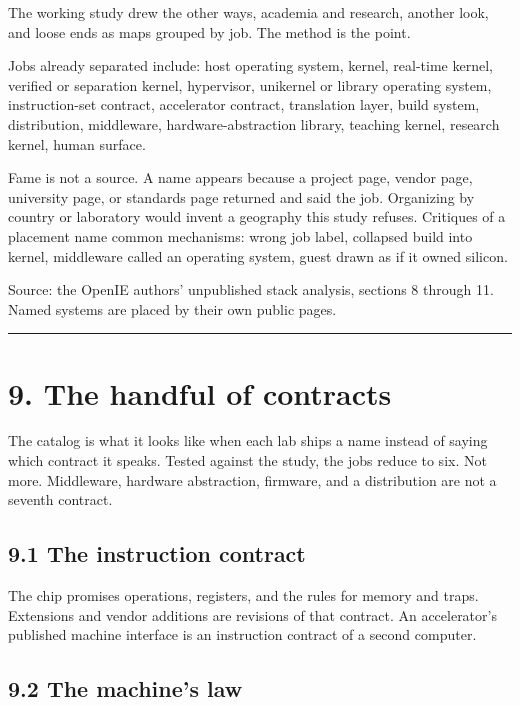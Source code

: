 \documentclass[10pt,letterpaper]{article}
\begin{document}
The working study drew the other ways, academia and research, another
look, and loose ends as maps grouped by job. The method is the point.

Jobs already separated include: host operating system, kernel, real-time
kernel, verified or separation kernel, hypervisor, unikernel or library
operating system, instruction-set contract, accelerator contract,
translation layer, build system, distribution, middleware,
hardware-abstraction library, teaching kernel, research kernel, human
surface.

Fame is not a source. A name appears because a project page, vendor
page, university page, or standards page returned and said the job.
Organizing by country or laboratory would invent a geography this study
refuses. Critiques of a placement name common mechanisms: wrong job
label, collapsed build into kernel, middleware called an operating
system, guest drawn as if it owned silicon.

Source: the OpenIE authors' unpublished stack analysis, sections 8
through 11. Named systems are placed by their own public pages.

\begin{center}\rule{0.5\linewidth}{0.5pt}\end{center}

\section{9. The handful of contracts}\label{the-handful-of-contracts}

The catalog is what it looks like when each lab ships a name instead of
saying which contract it speaks. Tested against the study, the jobs
reduce to six. Not more. Middleware, hardware abstraction, firmware, and
a distribution are not a seventh contract.

\subsection{9.1 The instruction
contract}\label{the-instruction-contract}

The chip promises operations, registers, and the rules for memory and
traps. Extensions and vendor additions are revisions of that contract.
An accelerator's published machine interface is an instruction contract
of a second computer.

\subsection{9.2 The machine's law}\label{the-machines-law}
\end{document}
